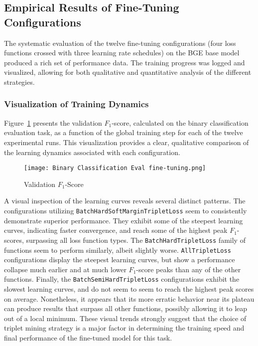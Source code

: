 \subsection{Empirical Results of Fine-Tuning Configurations}
The systematic evaluation of the twelve fine-tuning configurations (four loss functions crossed with three learning rate schedules) on the BGE base model produced a rich set of performance data. The training progress was logged and visualized, allowing for both qualitative and quantitative analysis of the different strategies.

\subsubsection{Visualization of Training Dynamics}
Figure~\ref{fig:binaryf1} presents the validation \(F_1\)-score, calculated on the binary classification evaluation task, as a function of the global training step for each of the twelve experimental runs. This visualization provides a clear, qualitative comparison of the learning dynamics associated with each configuration.
\begin{figure}[tb]
    \captionsetup{skip=5pt}
    \centering
    \texttt{[image: Binary Classification Eval fine-tuning.png]}
    \caption{Validation \(F_1\)-Score}
    \label{fig:binaryf1}
\end{figure}

A visual inspection of the learning curves reveals several distinct patterns. The configurations utilizing \verb|BatchHardSoftMarginTripletLoss| seem to consistently demonstrate superior performance.  They exhibit some of the steepest learning curves, indicating faster convergence, and reach some of the highest peak \(F_1\)-scores, surpassing all loss function types.  The \verb|BatchHardTripletLoss| family of functions seem to perform similarly, albeit slightly worse. \verb|AllTripletLoss| configurations display the steepest learning curves, but show a performance collapse much earlier and at much lower \(F_1\)-score peaks than any of the other functions.  Finally, the \verb|BatchSemiHardTripletLoss| configurations exhibit the slowest learning curves, and do not seem to seem to reach the highest peak scores on average.  Nonetheless, it appears that its more erratic behavior near its plateau can produce results that surpass all other functions, possibly allowing it to leap out of a local minimum.  These visual trends strongly suggest that the choice of triplet mining strategy is a major factor in determining the training speed and final performance of the fine-tuned model for this task.

